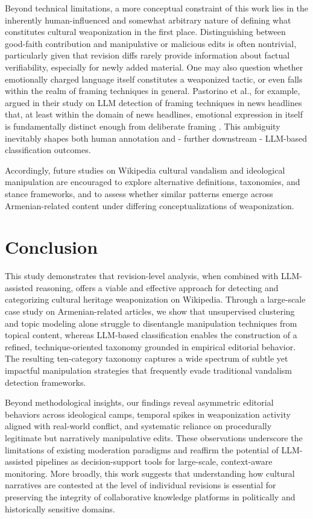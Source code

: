 \documentclass[11pt, a4paper, twoside, openright]{article} %
\begin{document}
Beyond technical limitations, a more conceptual constraint of this work lies in the inherently human-influenced and somewhat arbitrary nature of defining what constitutes cultural weaponization in the first place. Distinguishing between good-faith contribution and manipulative or malicious edits is often nontrivial, particularly given that revision diffs rarely provide information about factual verifiability, especially for newly added material. 
One may also question whether emotionally charged language itself constitutes a weaponized tactic, or even falls within the realm of framing techniques in general. Pastorino et al., for example, argued in their study on LLM detection of framing techniques in news headlines that, at least within the domain of news headlines, emotional expression in itself is fundamentally distinct enough from deliberate framing \cite{pastorino2024decodingnewsnarrativescritical}. This ambiguity inevitably shapes both human annotation and - further downstream - LLM-based classification outcomes.

Accordingly, future studies on Wikipedia cultural vandalism and ideological manipulation are encouraged to explore alternative definitions, taxonomies, and stance frameworks, and to assess whether similar patterns emerge across Armenian-related content under differing conceptualizations of weaponization.

\section{Conclusion}

This study demonstrates that revision-level analysis, when combined with LLM-assisted reasoning, offers a viable and effective approach for detecting and categorizing cultural heritage weaponization on Wikipedia. Through a large-scale case study on Armenian-related articles, we show that unsupervised clustering and topic modeling alone struggle to disentangle manipulation techniques from topical content, whereas LLM-based classification enables the construction of a refined, technique-oriented taxonomy grounded in empirical editorial behavior. The resulting ten-category taxonomy captures a wide spectrum of subtle yet impactful manipulation strategies that frequently evade traditional vandalism detection frameworks.

Beyond methodological insights, our findings reveal asymmetric editorial behaviors across ideological camps, temporal spikes in weaponization activity aligned with real-world conflict, and systematic reliance on procedurally legitimate but narratively manipulative edits. These observations underscore the limitations of existing moderation paradigms and reaffirm the potential of LLM-assisted pipelines as decision-support tools for large-scale, context-aware monitoring. More broadly, this work suggests that understanding how cultural narratives are contested at the level of individual revisions is essential for preserving the integrity of collaborative knowledge platforms in politically and historically sensitive domains.

\printbibliography
\end{document}

